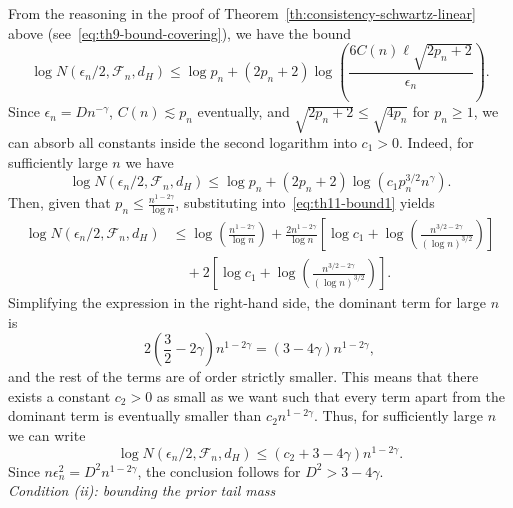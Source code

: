 \noindent From the reasoning in the proof of Theorem~\ref{th:consistency-schwartz-linear} above (see~\eqref{eq:th9-bound-covering}), we have the bound
\[
  \log N(\epsilon_n/2, \mathcal F_n, d_H)  \leq \log p_n + (2p_n+2)\log\left(\frac{6C(n) \ell\sqrt{2p_n+2}}{\epsilon_n}\right).
\]
Since \(\epsilon_n=Dn^{-\gamma}\), \(C(n)\lesssim  p_n\) eventually, and \(\sqrt{2p_n+2}\leq \sqrt{4p_n}\) for \(p_n\geq 1\), we can absorb all constants inside the second logarithm into \(c_1>0\). Indeed, for sufficiently large \(n\) we have
\begin{equation}\label{eq:th11-bound1}
  \log N(\epsilon_n/2, \mathcal F_n, d_H)  \leq \log p_n + (2p_n+2)\log\left(c_1 p_n^{3/2}n^\gamma\right).
\end{equation}
Then, given that \(p_n\leq \frac{n^{1-2\gamma}}{\log n}\), substituting into~\eqref{eq:th11-bound1} yields
\begin{align*}
  \log N(\epsilon_n/2, \mathcal F_n, d_H) & \leq \log \left(\frac{n^{1-2\gamma}}{\log n}\right)+ \frac{2n^{1-2\gamma}}{\log n}\left[\log c_1 + \log\left(\frac{n^{3/2-2\gamma}}{(\log n)^{3/2}}\right)\right] \\
                                          & \quad + 2\left[\log c_1 + \log\left(\frac{n^{3/2-2\gamma}}{(\log n)^{3/2}}\right)\right].
\end{align*}
Simplifying the expression in the right-hand side, the dominant term for large \(n\) is
\[
  2\left(\frac{3}{2}-2\gamma\right)n^{1-2\gamma} = (3-4\gamma)n^{1-2\gamma},
\]
and the rest of the terms are of order strictly smaller. This means that there exists a constant \(c_2>0\) as small as we want such that every term apart from the dominant term is eventually smaller than \(c_2 n^{1-2\gamma}\). Thus, for sufficiently large \(n\) we can write
\[
  \log N(\epsilon_n/2, \mathcal F_n, d_H)  \leq  (c_2 + 3-4\gamma)n^{1-2\gamma}.
\]
Since \(n\epsilon_n^2 =D^2n^{1-2\gamma}\), the conclusion follows for \(D^2>3-4\gamma\).\\


\noindent\textit{Condition (ii): bounding the prior tail mass}

